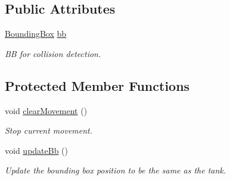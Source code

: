 \subsection*{Public Attributes}
\begin{DoxyCompactItemize}
\item 
\mbox{\label{class_tank_a8ceaceb9194a65d896947290a9394d8e}} 
\mbox{\hyperlink{class_bounding_box}{Bounding\+Box}} \mbox{\hyperlink{class_tank_a8ceaceb9194a65d896947290a9394d8e}{bb}}
\begin{DoxyCompactList}\small\item\em BB for collision detection. \end{DoxyCompactList}\end{DoxyCompactItemize}
\subsection*{Protected Member Functions}
\begin{DoxyCompactItemize}
\item 
\mbox{\label{class_tank_ad6df73f502e84c0e96c67f8d53671373}} 
void \mbox{\hyperlink{class_tank_ad6df73f502e84c0e96c67f8d53671373}{clear\+Movement}} ()
\begin{DoxyCompactList}\small\item\em Stop current movement. \end{DoxyCompactList}\item 
\mbox{\label{class_tank_a893c47a8494ea5a01edf8cc96e0932a6}} 
void \mbox{\hyperlink{class_tank_a893c47a8494ea5a01edf8cc96e0932a6}{update\+Bb}} ()
\begin{DoxyCompactList}\small\item\em Update the bounding box position to be the same as the tank. \end{DoxyCompactList}\end{DoxyCompactItemize}
